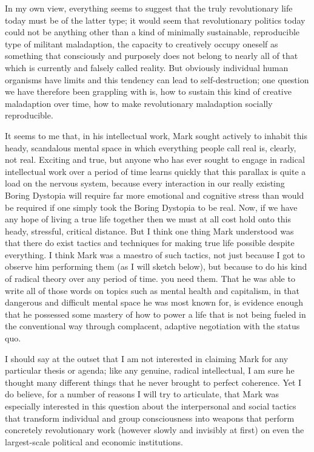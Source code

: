 \documentclass[a4paper,12pt,margin=.5in]{article}
\begin{document}
In my own view, everything seems to suggest that the truly revolutionary
life today must be of the latter type; it would seem that revolutionary
politics today could not be anything other than a kind of minimally
sustainable, reproducible type of militant maladaption, the capacity to
creatively occupy oneself as something that consciously and purposely
does not belong to nearly all of that which is currently and falsely
called reality. But obviously individual human organisms have limits and
this tendency can lead to self-destruction; one question we have
therefore been grappling with is, how to sustain this kind of creative
maladaption over time, how to make revolutionary maladaption socially
reproducible.

It seems to me that, in his intellectual work, Mark sought actively to
inhabit this heady, scandalous mental space in which everything people
call real is, clearly, not real. Exciting and true, but anyone who has
ever sought to engage in radical intellectual work over a period of time
learns quickly that this parallax is quite a load on the nervous system,
because every interaction in our really existing Boring Dystopia will
require far more emotional and cognitive stress than would be required
if one simply took the Boring Dystopia to be real. Now, if we have any
hope of living a true life together then we must at all cost hold onto
this heady, stressful, critical distance. But I think one thing Mark
understood was that there do exist tactics and techniques for making
true life possible despite everything. I think Mark was a maestro of
such tactics, not just because I got to observe him performing them (as
I will sketch below), but because to do his kind of radical theory over
any period of time. you need them. That he was able to write all of
those words on topics such as mental health and capitalism, in that
dangerous and difficult mental space he was most known for, is evidence
enough that he possessed some mastery of how to power a life that is not
being fueled in the conventional way through complacent, adaptive
negotiation with the status quo.

I should say at the outset that I am not interested in claiming Mark for
any particular thesis or agenda; like any genuine, radical intellectual,
I am sure he thought many different things that he never brought to
perfect coherence. Yet I do believe, for a number of reasons I will try
to articulate, that Mark was especially interested in this question
about the interpersonal and social tactics that transform individual and
group consciousness into weapons that perform concretely revolutionary
work (however slowly and invisibly at first) on even the largest-scale
political and economic institutions.
\end{document}
